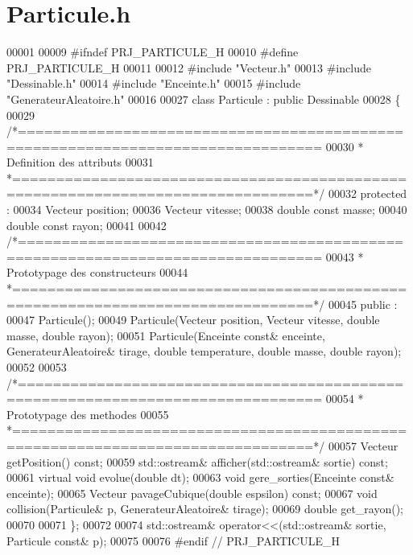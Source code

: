 \section{Particule.\+h}
\label{_particule_8h_source}

\begin{DoxyCode}
00001 
00009 \textcolor{preprocessor}{#ifndef PRJ\_PARTICULE\_H}
00010 \textcolor{preprocessor}{#define PRJ\_PARTICULE\_H}
00011 
00012 \textcolor{preprocessor}{#include "Vecteur.h"}
00013 \textcolor{preprocessor}{#include "Dessinable.h"}
00014 \textcolor{preprocessor}{#include "Enceinte.h"}
00015 \textcolor{preprocessor}{#include "GenerateurAleatoire.h"}
00016 
00027 \textcolor{keyword}{class }Particule : \textcolor{keyword}{public} Dessinable
00028 \{
00029 \textcolor{comment}{/*================================================================================}
00030 \textcolor{comment}{ * Definition des attributs}
00031 \textcolor{comment}{ *================================================================================*/}    
00032     \textcolor{keyword}{protected} :
00034     Vecteur position;
00036     Vecteur vitesse;
00038     \textcolor{keywordtype}{double} \textcolor{keyword}{const} masse;
00040     \textcolor{keywordtype}{double} \textcolor{keyword}{const} rayon;
00041     
00042 \textcolor{comment}{/*================================================================================}
00043 \textcolor{comment}{ * Prototypage des constructeurs}
00044 \textcolor{comment}{ *================================================================================*/}
00045     \textcolor{keyword}{public} :
00047     Particule();
00049     Particule(Vecteur position, Vecteur vitesse, \textcolor{keywordtype}{double} masse, \textcolor{keywordtype}{double} rayon);
00051     Particule(Enceinte \textcolor{keyword}{const}& enceinte, GenerateurAleatoire& tirage, \textcolor{keywordtype}{double} temperature, \textcolor{keywordtype}{double} 
      masse, \textcolor{keywordtype}{double} rayon);
00052     
00053 \textcolor{comment}{/*================================================================================}
00054 \textcolor{comment}{ * Prototypage des methodes}
00055 \textcolor{comment}{ *================================================================================*/}
00057     Vecteur getPosition() \textcolor{keyword}{const};
00059     std::ostream& afficher(std::ostream& sortie) \textcolor{keyword}{const};
00061     \textcolor{keyword}{virtual} \textcolor{keywordtype}{void} evolue(\textcolor{keywordtype}{double} dt);
00063     \textcolor{keywordtype}{void} gere_sorties(Enceinte \textcolor{keyword}{const}& enceinte);
00065     Vecteur pavageCubique(\textcolor{keywordtype}{double} espsilon) \textcolor{keyword}{const};
00067     \textcolor{keywordtype}{void} collision(Particule& p, GenerateurAleatoire& tirage);
00069     \textcolor{keywordtype}{double} get_rayon();
00070 
00071 \};
00072 
00074 std::ostream& operator<<(std::ostream& sortie, Particule \textcolor{keyword}{const}& p);
00075 
00076 \textcolor{preprocessor}{#endif // PRJ\_PARTICULE\_H}
\end{DoxyCode}
